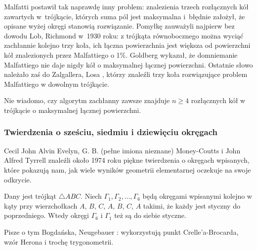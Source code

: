 Malfatti postawił tak naprawdę inny problem: znalezienia trzech rozłącznych kół zawartych w~trójkącie, których suma pól jest maksymalna i~błędnie założył, że opisane wyżej okręgi stanowią rozwiązanie.
Pomyłkę zauważyli najpierw bez dowodu Lob, Richmond \cite{lob_richmond_1930} w~1930 roku: z trójkąta równobocznego można wyciąć zachłannie kolejno trzy koła, ich łączna powierzchnia jest większa od powierzchni kół znalezionych przez Malfattiego o 1\%.
%
%
Goldberg \cite{goldberg_1967} wykazał, że domniemanie Malfattiego nie daje nigdy kół o maksymalnej łącznej powierzchni.
Ostatnie słowo należało zaś do Zalgallera, Losa \cite{zalgaller_los_1992}, którzy znaleźli trzy koła rozwiązujące problem Malfattiego w dowolnym trójkącie.
%
%

Nie wiadomo, czy algorytm zachłanny zawsze znajduje $n \ge 4$ rozłącznych kół w trójkącie o maksymalnej łącznej powierzchni.

\subsubsection{Twierdzenia o sześciu, siedmiu i dziewięciu okręgach}
Cecil John Alvin Evelyn, G. B. (pełne imiona nieznane) Money-Coutts i John Alfred Tyrrell znaleźli około 1974 roku piękne twierdzenia o okręgach wpisanych, które pokazują nam, jak wiele wyników geometrii elementarnej oczekuje na swoje odkrycie.

\begin{proposition}
	Dany jest trójkąt $\triangle ABC$.
	Niech $\Gamma_1, \Gamma_2, \ldots, \Gamma_6$ będą okręgami wpisanymi kolejno w kąty przy wierzchołkach $A$, $B$, $C$, $A$, $B$, $C$, $A$ takimi, że każdy jest styczny do poprzedniego.
	Wtedy okręgi $\Gamma_6$ i $\Gamma_1$ też są do siebie styczne.
\end{proposition}

Pisze o tym Bogdańska, Neugebauer \cite[s. 101]{neugebauer_2018}: wykorzystują punkt Crelle'a-Brocarda, wzór Herona i trochę trygonometrii.

